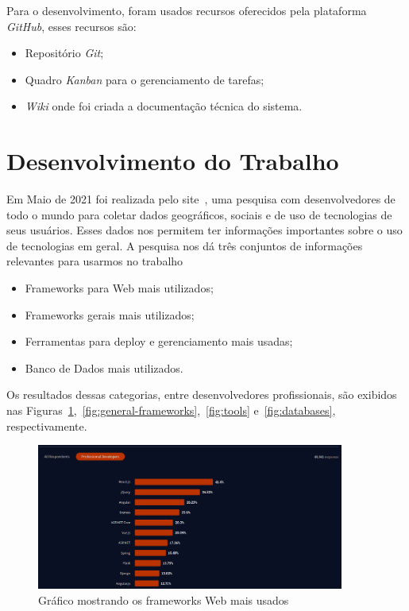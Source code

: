 \documentclass[12pt]{article}
\begin{document}
Para o desenvolvimento, foram usados recursos oferecidos pela plataforma \textit{GitHub}, esses recursos são:

\begin{itemize}
  \item Repositório \textit{Git};
  \item Quadro \textit{Kanban} para o gerenciamento de tarefas;
  \item \textit{Wiki} onde foi criada a documentação técnica do sistema.
\end{itemize}

\section{Desenvolvimento do Trabalho}\label{Desenvolvimento}

Em Maio de 2021 foi realizada pelo site~\cite{stack11}, uma pesquisa com desenvolvedores de todo o mundo para
coletar dados geográficos, sociais e de uso de tecnologias de seus usuários. Esses dados nos permitem ter
informações importantes sobre o uso de tecnologias em geral. A pesquisa nos dá três conjuntos
de informações relevantes para usarmos no trabalho

\begin{itemize}
  \item Frameworks para Web mais utilizados;
  \item Frameworks gerais mais utilizados;
  \item Ferramentas para deploy e gerenciamento mais usadas;
  \item Banco de Dados mais utilizados.
\end{itemize}

Os resultados dessas categorias, entre desenvolvedores profissionais, são exibidos nas
Figuras~\ref{fig:web-frameworks},~\ref{fig:general-frameworks},~\ref{fig:tools} e~\ref{fig:databases}, respectivamente.

\begin{figure}[h]
  \centering
  \includegraphics[width=0.9\textwidth]{stackoverflow/web_frameworks_usage.png}
  \caption{Gráfico mostrando os frameworks Web mais usados}\label{fig:web-frameworks}
\end{figure}
\end{document}
